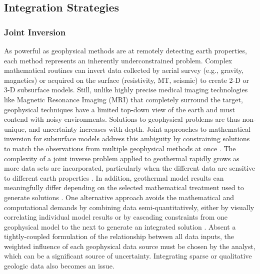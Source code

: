 \subsection{Integration Strategies}\label{ch2:integration_strategies}
\subsubsection{Joint Inversion}\label{ch2:joint_invert}
As powerful as geophysical methods are at remotely detecting earth properties, each method represents an inherently underconstrained problem. Complex mathematical routines can invert data collected by aerial survey (e.g., gravity, magnetics) or acquired on the surface (resistivity, MT, seismic) to create 2-D or 3-D subsurface models. Still, unlike highly precise medical imaging technologies like Magnetic Resonance Imaging (MRI) that completely surround the target, geophysical techniques have a limited top-down view of the earth and must contend with noisy environments. Solutions to geophysical problems are thus non-unique, and uncertainty increases with depth. Joint approaches to mathematical inversion for subsurface models address this ambiguity by constraining solutions to match the observations from multiple geophysical methods at once \citep{vozoff_joint_1975}. The complexity of a joint inverse problem applied to geothermal rapidly grows as more data sets are incorporated, particularly when the different data are sensitive to different earth properties \citep{moorkamp_framework_2011}. In addition, geothermal model results can meaningfully differ depending on the selected mathematical treatment used to generate solutions \citep{rosenkjaer_comparison_2015}. One alternative approach avoids the mathematical and computational demands by combining data semi-quantitatively, either by visually correlating individual model results or by cascading constraints from one geophysical model to the next to generate an integrated solution \citep{jousset_hengill_2011, lichoro_joint_2019}. Absent a tightly-coupled formulation of the relationship between all data inputs, the weighted influence of each geophysical data source must be chosen by the analyst, which can be a significant source of uncertainty. Integrating sparse or qualitative geologic data also becomes an issue.

